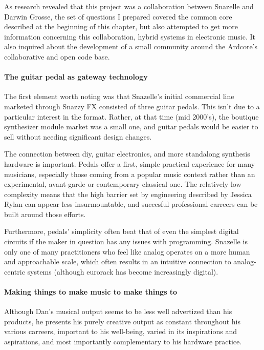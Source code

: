 As research revealed that this project was a collaboration between Snazelle and Darwin Grosse, the set of questions I prepared covered the common core described at the beginning of this chapter, but also attempted to get more information concerning this collaboration, hybrid systems in electronic music. It also inquired about the development of a small community around the Ardcore's collaborative and open code base. 

\paragraph{The guitar pedal as gateway technology}

The first element worth noting was that Snazelle's initial commercial line marketed through Snazzy FX consisted of three guitar pedals. This isn't due to a particular interest in the format. Rather, at that time (mid 2000's), the boutique synthesizer module market was a small one, and guitar pedals would be easier to sell without needing significant design changes. 

The connection between diy, guitar electronics, and more standalong synthesis hardware is important. Pedals offer a first, simple practical experience for many musicians, especially those coming from a popular music context rather than an experimental, avant-garde or contemporary classical one. The relatively low complexity means that the high barrier set by engineering described by Jessica Rylan can appear less insurmountable, and succesful professional carreers can be built around those efforts. 

Furthermore, pedals' simplicity often beat that of even the simplest digital circuits if the maker in question has any issues with programming. Snazelle is only one of many practitioners who feel like analog operates on a more human and approachable scale, which often results in an intuitive connection to analog-centric systems (although eurorack has become increasingly digital). 

\paragraph{Making things to make music to make things to}

Although Dan's musical output seems to be less well advertized than his products, he presents his purely creative output as constant throughout his various carreers, important to his well-being, varied in its inspirations and aspirations, and most importantly complementary to his hardware practice. 

